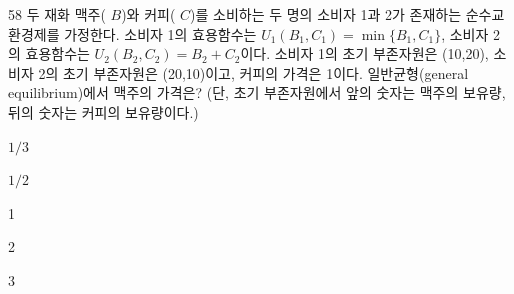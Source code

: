 \begin{question}{58}
두 재화 맥주( $B$)와 커피( $C$)를 소비하는 두 명의 소비자 1과 2가 존재하는 순수교환경제를 가정한다. 소비자 1의 효용함수는 $U_{1}(B_{1},C_{1})=\min\{B_{1},C_{1}\}$, 소비자 2의 효용함수는 $U_{2}(B_{2},C_{2})=B_{2}+C_{2}$이다. 소비자 1의 초기 부존자원은 (10,20), 소비자 2의 초기 부존자원은 (20,10)이고, 커피의 가격은 1이다. 일반균형(general equilibrium)에서 맥주의 가격은? (단, 초기 부존자원에서 앞의 숫자는 맥주의 보유량, 뒤의 숫자는 커피의 보유량이다.)
\begin{choices}
  \item $1/3$
  \item $1/2$
  \item 1
  \item 2
  \item 3
\end{choices}
\end{question}
